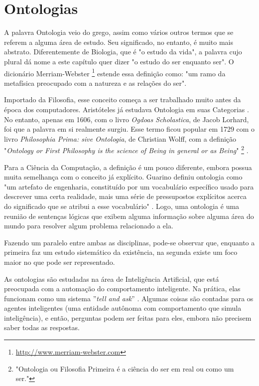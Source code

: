 \chapter{Ontologias}
\label{chap:ontologias}

\lettrine{A}{} palavra Ontologia veio do grego, assim como vários outros termos que se referem a alguma área de estudo. Seu significado, no entanto, é muito mais abstrato. Diferentemente de Biologia, que é "o estudo da vida", a palavra cujo plural dá nome a este capítulo quer dizer "o estudo do ser enquanto ser". O dicionário Merriam-Webster \footnote{\url{http://www.merriam-webster.com}} estende essa definição como: "um ramo da metafísica preocupado com a natureza e as relações do ser".

Importado da Filosofia, esse conceito começa a ser trabalhado muito antes da época dos computadores. Aristóteles já estudava Ontologia em suas Categorias \citep{ontoDahlberg}. No entanto, apenas em 1606, com o livro \textit{Ogdoas Scholastica}, de Jacob Lorhard, foi que a palavra em si realmente surgiu. Esse termo ficou popular em 1729 com o livro \textit{Philosophia Prima: sive Ontologia}, de Christian Wolff, com a definição "\textit{Ontology or First Philosophy is the science of Being in general or as Being}" \footnote{"Ontologia ou Filosofia Primeira é a ciência do ser em real ou como um ser."}  \citep{ontoNickles}.

Para a Ciência da Computação, a definição é um pouco diferente, embora possua muita semelhança com o conceito já explícito. Guarino definiu ontologia como "um artefato de engenharia, constituído por um vocabulário específico usado para descrever uma certa realidade, mais uma série de pressupostos explícitos acerca do significado que se atribui a esse vocabulário" \citep{ontoGuarino}. Logo, uma ontologia é uma reunião de sentenças lógicas que exibem alguma informação sobre alguma área do mundo para resolver algum problema relacionado a ela.

Fazendo um paralelo entre ambas as disciplinas, pode-se observar que, enquanto a primeira faz um estudo sistemático da existência, na segunda existe um foco maior no que pode ser representado.

As ontologias são estudadas na área de Inteligência Artificial, que está preocupada com a automação do comportamento inteligente. Na prática, elas funcionam como um sistema ''\textit{tell and ask}'' \cite{ontoRussel}. Algumas coisas são contadas para os agentes inteligentes (uma entidade autônoma com comportamento que simula inteligência), e então, perguntas podem ser feitas para eles, embora não precisem saber todas as respostas. 

